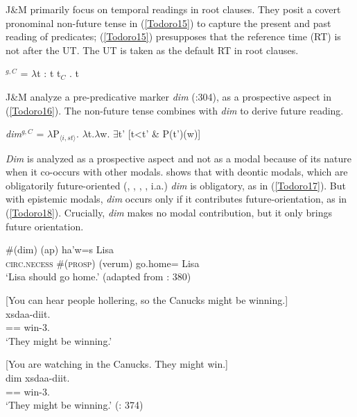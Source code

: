 \documentclass[output=paper]{langscibook}
\begin{document}
J\&M primarily focus on temporal readings in root clauses. They posit a covert pronominal non-future tense in (\ref{Todoro15}) to capture the present and past reading of predicates; (\ref{Todoro15}) presupposes that the reference time (RT) is not after the UT. The UT is taken as the default RT in root clauses. 

\begin{exe}
\ex \label{Todoro15}
\textlbrackdbl{}\textrbrackdbl$^{g,C}$ = {$\lambda$}t : t {\leq} t$_{C}$ . t
\end{exe}

J\&M analyze a pre-predicative marker \emph{dim} (\citealt{rigsby1986a}:304), as a prospective aspect in (\ref{Todoro16}). The non-future tense combines with \textit{dim} to derive future reading.

\begin{exe}
\ex \label{Todoro16}\textlbrackdbl\emph{dim}\textrbrackdbl$^{g,C}$ = {$\lambda$}P$_{\langle i,st\rangle}$. {$\lambda$}t.{$\lambda$}w. {$\exists$}t' [t<t’ \& P(t’)(w)]
\end{exe}

\emph{Dim} is analyzed as a prospective aspect and not as a modal because of its nature when it co-occurs with other modals. \citet{matthewson2013a} shows that with deontic modals, which are obligatorily future-oriented (\citealt{abusch2012a}, \citealt{thomas2014a}, \citealt{klecha2011a}, \citealt{chen2017a}, i.a.)  \emph{dim} is obligatory, as in (\ref{Todoro17}). But with epistemic modals, \emph{dim} occurs only if it contributes future-orientation, as in (\ref{Todoro18}). Crucially, \emph{dim} makes no modal contribution, but it only brings future orientation.

\begin{exe}
\ex \label{Todoro17}
 \#({dim}) ({ap}) {ha'w=s} {Lisa} \\
    \textsc{circ.necess} \#(\textsc{prosp}) (\tsc{}verum) go.home={\pn} Lisa\\
\glt `Lisa should go home.' (adapted from \citealt{matthewson2013a}: 380) 

\ex \label{Todoro18}
\begin{xlist}

\ex \label{Todoro18a} [{You can hear people hollering, so the Canucks might be winning.}] \\
	{xsdaa-diit}. \\
    =={\cn} win-3{\pl}.{\seriesII} \\
\glt `They might be winning.' 

\ex \label{Todoro18b} [{You are watching in the Canucks. They might win.}]\\
 {dim} {xsdaa-diit}. \\
    =={\cn}  win-3{\pl}.{\seriesII} \\
\glt `They might be winning.' (\citealt{matthewson2013a}: 374)

\end{xlist}
\end{exe}
\end{document}
